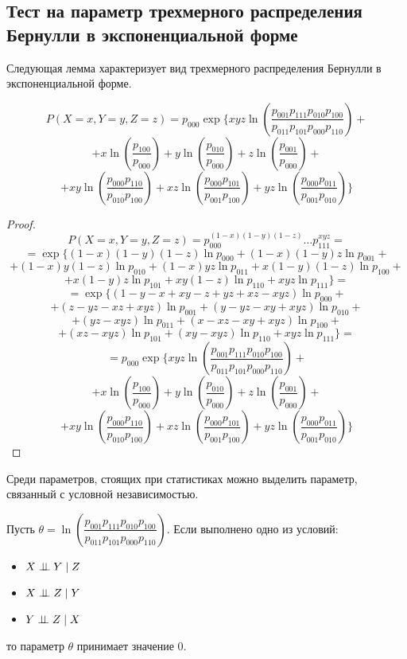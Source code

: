 \subsection{Тест на параметр трехмерного распределения Бернулли в экспоненциальной форме}\label{expon_form_section}
Следующая лемма характеризует вид трехмерного распределения Бернулли в экспоненциальной форме.
\begin{lemma}\label{factorization}
    $$
    P(X=x,Y=y,Z=z)= p_{000}
        \exp \Biggl\{  xyz \ln  \left(\dfrac{p_{001}p_{111}p_{010}p_{100}}{p_{011}p_{101}p_{000}p_{110}}\right) +$$
    $$ +
        x \ln\left(\dfrac{p_{100}}{p_{000}}\right) +  y \ln\left(\dfrac{p_{010}}{p_{000}}\right) +
        z \ln\left(\dfrac{p_{001}}{p_{000}}\right) +
    $$
    $$
        + xy \ln \left(\dfrac{p_{000}p_{110}}{p_{010}p_{100}}\right) +
        xz \ln \left(\dfrac{p_{000}p_{101}}{p_{001}p_{100}}\right) +
        yz \ln \left(\dfrac{p_{000}p_{011}}{p_{001}p_{010}}\right) \Biggr\}
    $$
\end{lemma}
\begin{proof}
    $$
    P(X=x,Y=y,Z=z) = p_{000}^{(1-x)(1-y)(1-z)} \ldots p_{111}^{x y z} =
    $$
    $$
        =\exp \Biggl\{ (1-x)(1-y)(1-z) \ln p_{000} +
        (1-x)(1-y)z \ln p_{001}+
    $$
    $$
        + (1-x)y(1-z) \ln p_{010} + (1-x)y z \ln p_{011} +  x(1-y)(1-z) \ln p_{100} +
    $$
    $$
        +   x(1-y) z \ln p_{101}
        +   x y (1-z) \ln p_{110} +   x y z \ln p_{111} \Biggr\} =
    $$
    $$
        =\exp \Biggl\{   ( 1 - y -  x +  x y
        -  z +  y z +  x z -  x y z ) \ln p_{000} +
    $$
    $$
        +    (z -  y z -  x z +  x y z) \ln p_{001}  +
          (y -  y z -  x y +  x y z)  \ln p_{010} +
    $$
    $$
        +    (y z -  x y z ) \ln p_{011} +
           (x -  x z -  x y +  x y z ) \ln p_{100} +
    $$
    $$
        +   (x z -  x y z ) \ln p_{101} +   (x y -  x y z) \ln p_{110} +
          x y z \ln p_{111} \Biggr\}=
    $$
    $$
        = p_{000}
        \exp \Biggl\{  xyz \ln  \left(\dfrac{p_{001}p_{111}p_{010}p_{100}}{p_{011}p_{101}p_{000}p_{110}}\right) +$$
    $$ +
        x \ln\left(\dfrac{p_{100}}{p_{000}}\right) +  y \ln\left(\dfrac{p_{010}}{p_{000}}\right) +
        z \ln\left(\dfrac{p_{001}}{p_{000}}\right) +
    $$
    $$
        + xy \ln \left(\dfrac{p_{000}p_{110}}{p_{010}p_{100}}\right) +
        xz \ln \left(\dfrac{p_{000}p_{101}}{p_{001}p_{100}}\right) +
        yz \ln \left(\dfrac{p_{000}p_{011}}{p_{001}p_{010}}\right) \Biggr\}
    $$
\end{proof}
Среди параметров, стоящих при статистиках можно выделить параметр, связанный с условной независимостью.
\begin{theorem}
    Пусть $\theta = \ln  \left(\dfrac{p_{001}p_{111}p_{010}p_{100}}{p_{011}p_{101}p_{000}p_{110}}\right)$.
    Если выполнено одно из условий:
    \begin{itemize}
        \item $X \perp\!\!\!\perp Y \mid Z$
        \item $X \perp\!\!\!\perp Z \mid Y$
        \item $Y \perp\!\!\!\perp Z \mid X$
    \end{itemize}
    то параметр $\theta$ принимает значение $0$.
    \end{theorem}
    
